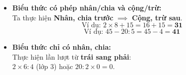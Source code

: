 \documentclass[11pt,a4paper]{article}
\begin{document}
\begin{minipage}[t]{0.49\textwidth}\vspace{0pt}
\begin{tcolorbox}[
  enhanced,
  colback=teal!4!white,
  colframe=teal!75!black,
  arc=2mm, boxrule=0.8pt,
  left=2mm, right=2mm, top=1.8mm, bottom=1.8mm,
  title={\footnotesize\bfseries\color{white}\faSliders\ 2. Kĩ năng tính dãy biểu thức}
]
{\footnotesize
\begin{itemize}\setlength{\itemsep}{1pt}\setlength{\leftskip}{-2.5mm}
  \item \textbf{Biểu thức có phép nhân/chia và cộng/trừ:}\\
  Ta thực hiện \textbf{Nhân, chia trước} $\implies$ \textbf{Cộng, trừ sau}.
  $$\text{Ví dụ: } 2 \times 8 + 15 = 16 + 15 = \mathbf{31}$$
  $$\text{Ví dụ: } 45 - 20 : 5 = 45 - 4 = \mathbf{41}$$
  \item \textbf{Biểu thức chỉ có nhân, chia:}\\
  Thực hiện lần lượt từ \textbf{trái sang phải}:\\
  $2 \times 6 : 4$ (lớp 3) hoặc $20 : 2 \times 0 = 0$.
\end{itemize}
}
\end{tcolorbox}
\end{minipage}
\end{document}
